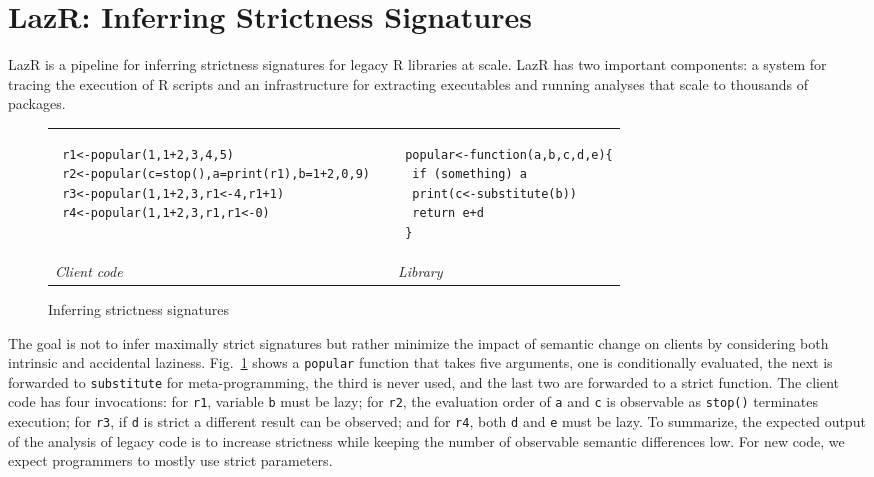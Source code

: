 \documentclass[review,creen,acmsmall]{acmart}
\renewcommand{\c}[1]{\lstinline |#1|\xspace}
\newcommand{\lazr}{{\sf LazR}\xspace}
\begin{document}
\section{LazR: Inferring Strictness Signatures}\label{sec:lazr}

\lazr is a pipeline for inferring strictness signatures for legacy R libraries
at scale. \lazr has two important components: a system for tracing the execution
of R scripts and an infrastructure for extracting executables and running
analyses that scale to thousands of packages.

\begin{figure}[!h]
\begin{tabular}{lll}
  \begin{minipage}{7cm}
\begin{lstlisting}
 r1<-popular(1,1+2,3,4,5)
 r2<-popular(c=stop(),a=print(r1),b=1+2,0,9)
 r3<-popular(1,1+2,3,r1<-4,r1+1)
 r4<-popular(1,1+2,3,r1,r1<-0)
\end{lstlisting}
\end{minipage}
&&
\begin{minipage}{5cm}
\begin{lstlisting}
 popular<-function(a,b,c,d,e){
  if (something) a
  print(c<-substitute(b))
  return e+d
 }
\end{lstlisting}
\end{minipage}\\
\it Client code&& \it Library
\end{tabular}%
\caption{Inferring strictness signatures}\label{iss} %
\end{figure}


The goal is not to infer maximally strict signatures but rather minimize the
impact of semantic change on clients by considering both intrinsic and
accidental laziness. Fig.~\ref{iss} shows a \c{popular} function that takes five
arguments, one is conditionally evaluated, the next is forwarded to
\c{substitute} for meta-programming, the third is never used, and the last two
are forwarded to a strict function. The client code has four invocations: for
\c{r1}, variable \c b must be lazy; for \c{r2}, the evaluation order of \c a and
\c c is observable as \c{stop()} terminates execution; for \c{r3}, if \c{d} is
strict a different result can be observed; and for \c{r4}, both \c d and \c{e}
must be lazy. To summarize, the expected output of the analysis of legacy code
is to increase strictness while keeping the number of observable semantic
differences low. For new code, we expect programmers to mostly use strict
parameters.
\end{document}
